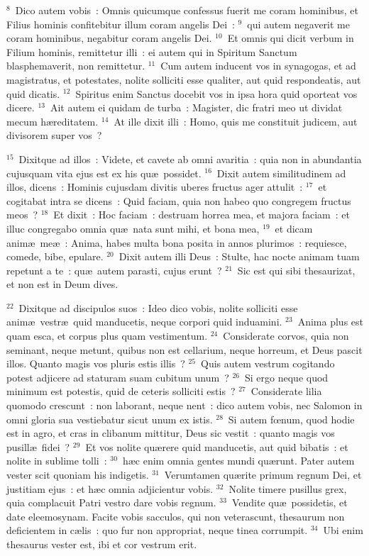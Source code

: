 ${}^{8}$~Dico autem vobis~: Omnis quicumque confessus fuerit me coram hominibus, et Filius hominis confitebitur illum coram angelis Dei~:
${}^{9}$~qui autem negaverit me coram hominibus, negabitur coram angelis Dei.
${}^{10}$~Et omnis qui dicit verbum in Filium hominis, remittetur illi~: ei autem qui in Spiritum Sanctum blasphemaverit, non remittetur.
${}^{11}$~Cum autem inducent vos in synagogas, et ad magistratus, et potestates, nolite solliciti esse qualiter, aut quid respondeatis, aut quid dicatis.
${}^{12}$~Spiritus enim Sanctus docebit vos in ipsa hora quid oporteat vos dicere.
${}^{13}$~Ait autem ei quidam de turba~: Magister, dic fratri meo ut dividat mecum h\ae reditatem.
${}^{14}$~At ille dixit illi~: Homo, quis me constituit judicem, aut divisorem super vos~?


${}^{15}$~Dixitque ad illos~: Videte, et cavete ab omni avaritia~: quia non in abundantia cujusquam vita ejus est ex his qu\ae\ possidet.
${}^{16}$~Dixit autem similitudinem ad illos, dicens~: Hominis cujusdam divitis uberes fructus ager attulit~:
${}^{17}$~et cogitabat intra se dicens~: Quid faciam, quia non habeo quo congregem fructus meos~?
${}^{18}$~Et dixit~: Hoc faciam~: destruam horrea mea, et majora faciam~: et illuc congregabo omnia qu\ae\ nata sunt mihi, et bona mea,
${}^{19}$~et dicam anim\ae\ me\ae~: Anima, habes multa bona posita in annos plurimos~: requiesce, comede, bibe, epulare.
${}^{20}$~Dixit autem illi Deus~: Stulte, hac nocte animam tuam repetunt a te~: qu\ae\ autem parasti, cujus erunt~?
${}^{21}$~Sic est qui sibi thesaurizat, et non est in Deum dives.


${}^{22}$~Dixitque ad discipulos suos~: Ideo dico vobis, nolite solliciti esse anim\ae\ vestr\ae\ quid manducetis, neque corpori quid induamini.
${}^{23}$~Anima plus est quam esca, et corpus plus quam vestimentum.
${}^{24}$~Considerate corvos, quia non seminant, neque metunt, quibus non est cellarium, neque horreum, et Deus pascit illos. Quanto magis vos pluris estis illis~?
${}^{25}$~Quis autem vestrum cogitando potest adjicere ad staturam suam cubitum unum~?
${}^{26}$~Si ergo neque quod minimum est potestis, quid de ceteris solliciti estis~?
${}^{27}$~Considerate lilia quomodo crescunt~: non laborant, neque nent~: dico autem vobis, nec Salomon in omni gloria sua vestiebatur sicut unum ex istis.
${}^{28}$~Si autem fœnum, quod hodie est in agro, et cras in clibanum mittitur, Deus sic vestit~: quanto magis vos pusill\ae\ fidei~?
${}^{29}$~Et vos nolite qu\ae rere quid manducetis, aut quid bibatis~: et nolite in sublime tolli~:
${}^{30}$~h\ae c enim omnia gentes mundi qu\ae runt. Pater autem vester scit quoniam his indigetis.
${}^{31}$~Verumtamen qu\ae rite primum regnum Dei, et justitiam ejus~: et h\ae c omnia adjicientur vobis.
${}^{32}$~Nolite timere pusillus grex, quia complacuit Patri vestro dare vobis regnum.
${}^{33}$~Vendite qu\ae\ possidetis, et date eleemosynam. Facite vobis sacculos, qui non veterascunt, thesaurum non deficientem in c\ae lis~: quo fur non appropriat, neque tinea corrumpit.
${}^{34}$~Ubi enim thesaurus vester est, ibi et cor vestrum erit.


